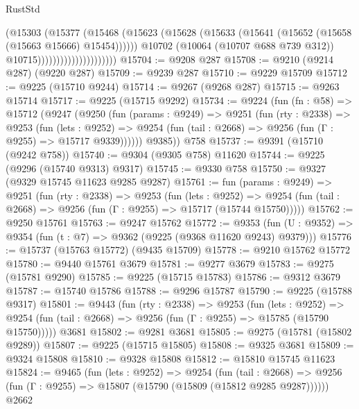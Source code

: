 \begin{lexlean}{RustStd}
\begin{coremodule}
                                        (@15303
                                          (@15377
                                            (@15468
                                              (@15623
                                                (@15628
                                                  (@15633
                                                    (@15641
                                                      (@15652 (@15658 (@15663 @15666) @15454))))))
                                              @10702
                                              (@10064 (@10707 @688 @739 @312))
                                              @10715)))))))))))))))))))))
@15704 := @9208 @287
@15708 := @9210 (@9214 @287) (@9220 @287)
@15709 := @9239 @287
@15710 := @9229 @15709
@15712 := @9225 (@15710 @9244)
@15714 := @9267 (@9268 @287)
@15715 := @9263 @15714
@15717 := @9225 (@15715 @9292)
@15734 := @9224
    (fun (fn : @58) =>
    @15712
      (@9247
        (@9250
          (fun (params : @9249) =>
          @9251
            (fun (rty : @2338) =>
            @9253
              (fun (lets : @9252) =>
              @9254 (fun (tail : @2668) => @9256 (fun (Γ : @9255) => @15717 @9339))))))
        @9385))
    @758
@15737 := @9391 (@15710 (@9242 @758))
@15740 := @9304 (@9305 @758) @11620
@15744 := @9225 (@9296 (@15740 @9313) @9317)
@15745 := @9330 @758
@15750 := @9327 (@9329 @15745 @11623 @9285 @9287)
@15761 := fun (params : @9249) =>
  @9251
    (fun (rty : @2338) =>
    @9253
      (fun (lets : @9252) =>
      @9254 (fun (tail : @2668) => @9256 (fun (Γ : @9255) => @15717 (@15744 @15750)))))
@15762 := @9250 @15761
@15763 := @9247 @15762
@15772 := @9353
    (fun (U : @9352) => @9354 (fun (t : @7) => @9362 (@9225 (@9368 @11620 @9243) @9379)))
@15776 := @15737 (@15763 @15772) (@9435 @15709)
@15778 := @9210 @15762 @15772
@15780 := @9440 @15761 @3679
@15781 := @9277 @3679
@15783 := @9275 (@15781 @9290)
@15785 := @9225 (@15715 @15783)
@15786 := @9312 @3679
@15787 := @15740 @15786
@15788 := @9296 @15787
@15790 := @9225 (@15788 @9317)
@15801 := @9443
    (fun (rty : @2338) =>
    @9253
      (fun (lets : @9252) =>
      @9254 (fun (tail : @2668) => @9256 (fun (Γ : @9255) => @15785 (@15790 @15750)))))
    @3681
@15802 := @9281 @3681
@15805 := @9275 (@15781 (@15802 @9289))
@15807 := @9225 (@15715 @15805)
@15808 := @9325 @3681
@15809 := @9324 @15808
@15810 := @9328 @15808
@15812 := @15810 @15745 @11623
@15824 := @9465
    (fun (lets : @9252) =>
    @9254
      (fun (tail : @2668) =>
      @9256 (fun (Γ : @9255) => @15807 (@15790 (@15809 (@15812 @9285 @9287))))))
    @2662

\end{coremodule}
\end{lexlean}
